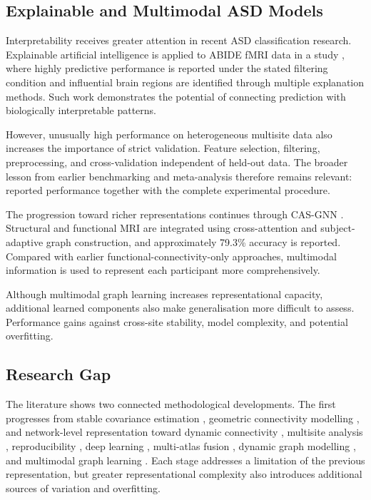 \subsection{Explainable and Multimodal ASD Models}

Interpretability receives greater attention in recent ASD classification research. Explainable artificial intelligence is applied to ABIDE fMRI data in a study \cite{Vidyaetal2025}, where highly predictive performance is reported under the stated filtering condition and influential brain regions are identified through multiple explanation methods. Such work demonstrates the potential of connecting prediction with biologically interpretable patterns.

However, unusually high performance on heterogeneous multisite data also increases the importance of strict validation. Feature selection, filtering, preprocessing, and cross-validation  independent of held-out data. The broader lesson from earlier benchmarking \cite{Dadietal2019} and meta-analysis \cite{Santanaetal2022} therefore remains relevant: reported performance  together with the complete experimental procedure.

The progression toward richer representations continues through CAS-GNN \cite{Tangetal2026CASGNN}. Structural and functional MRI are integrated using cross-attention and subject-adaptive graph construction, and approximately 79.3\% accuracy is reported. Compared with earlier functional-connectivity-only approaches, multimodal information is used to represent each participant more comprehensively.

Although multimodal graph learning increases representational capacity, additional learned components also make generalisation more difficult to assess. Performance gains  against cross-site stability, model complexity, and potential overfitting.

\subsection{Research Gap}

The literature shows two connected methodological developments. The first progresses from stable covariance estimation \cite{LedoitWolf2004}, geometric connectivity modelling \cite{Varoquauxetal2010}, and network-level representation \cite{Yeoetal2011} toward dynamic connectivity \cite{Hutchisonetal2013,LeonardiVanDeVille2015,Pretietal2017}, multisite analysis \cite{DiMartinoetal2014}, reproducibility \cite{Abrahametal2017}, deep learning \cite{Heinsfeldetal2018,Eslamietal2019,AlmuqhimSaeed2021}, multi-atlas fusion \cite{Liuetal2024MADE}, dynamic graph modelling \cite{Tangetal2025GNNLSTM}, and multimodal graph learning \cite{Tangetal2026CASGNN}. Each stage addresses a limitation of the previous representation, but greater representational complexity also introduces additional sources of variation and overfitting.


